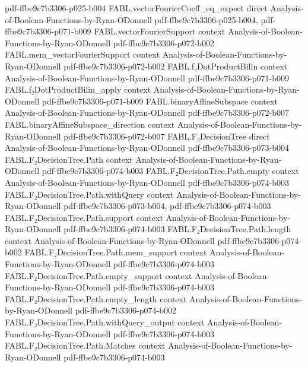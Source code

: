 \begin{theorem}
{    pdf-ffbe9c7b3306-p025-b004}
\proofstep
  {FABL.vectorFourierCoeff_eq_expect}
  {direct}
  {Analysis-of-Boolean-Functions-by-Ryan-ODonnell}
  {pdf-ffbe9c7b3306-p025-b004,
    pdf-ffbe9c7b3306-p071-b009}
\proofstep
  {FABL.vectorFourierSupport}
  {context}
  {Analysis-of-Boolean-Functions-by-Ryan-ODonnell}
  {pdf-ffbe9c7b3306-p072-b002}
\proofstep
  {FABL.mem_vectorFourierSupport}
  {context}
  {Analysis-of-Boolean-Functions-by-Ryan-ODonnell}
  {pdf-ffbe9c7b3306-p072-b002}
\proofstep
  {FABL.f₂DotProductBilin}
  {context}
  {Analysis-of-Boolean-Functions-by-Ryan-ODonnell}
  {pdf-ffbe9c7b3306-p071-b009}
\proofstep
  {FABL.f₂DotProductBilin_apply}
  {context}
  {Analysis-of-Boolean-Functions-by-Ryan-ODonnell}
  {pdf-ffbe9c7b3306-p071-b009}
\proofstep
  {FABL.binaryAffineSubspace}
  {context}
  {Analysis-of-Boolean-Functions-by-Ryan-ODonnell}
  {pdf-ffbe9c7b3306-p072-b007}
\proofstep
  {FABL.binaryAffineSubspace_direction}
  {context}
  {Analysis-of-Boolean-Functions-by-Ryan-ODonnell}
  {pdf-ffbe9c7b3306-p072-b007}
\proofstep
  {FABL.F₂DecisionTree}
  {direct}
  {Analysis-of-Boolean-Functions-by-Ryan-ODonnell}
  {pdf-ffbe9c7b3306-p073-b004}
\proofstep
  {FABL.F₂DecisionTree.Path}
  {context}
  {Analysis-of-Boolean-Functions-by-Ryan-ODonnell}
  {pdf-ffbe9c7b3306-p074-b003}
\proofstep
  {FABL.F₂DecisionTree.Path.empty}
  {context}
  {Analysis-of-Boolean-Functions-by-Ryan-ODonnell}
  {pdf-ffbe9c7b3306-p074-b003}
\proofstep
  {FABL.F₂DecisionTree.Path.withQuery}
  {context}
  {Analysis-of-Boolean-Functions-by-Ryan-ODonnell}
  {pdf-ffbe9c7b3306-p073-b004,
    pdf-ffbe9c7b3306-p074-b003}
\proofstep
  {FABL.F₂DecisionTree.Path.support}
  {context}
  {Analysis-of-Boolean-Functions-by-Ryan-ODonnell}
  {pdf-ffbe9c7b3306-p074-b003}
\proofstep
  {FABL.F₂DecisionTree.Path.length}
  {context}
  {Analysis-of-Boolean-Functions-by-Ryan-ODonnell}
  {pdf-ffbe9c7b3306-p074-b002}
\proofstep
  {FABL.F₂DecisionTree.Path.mem_support}
  {context}
  {Analysis-of-Boolean-Functions-by-Ryan-ODonnell}
  {pdf-ffbe9c7b3306-p074-b003}
\proofstep
  {FABL.F₂DecisionTree.Path.empty_support}
  {context}
  {Analysis-of-Boolean-Functions-by-Ryan-ODonnell}
  {pdf-ffbe9c7b3306-p074-b003}
\proofstep
  {FABL.F₂DecisionTree.Path.empty_length}
  {context}
  {Analysis-of-Boolean-Functions-by-Ryan-ODonnell}
  {pdf-ffbe9c7b3306-p074-b002}
\proofstep
  {FABL.F₂DecisionTree.Path.withQuery_output}
  {context}
  {Analysis-of-Boolean-Functions-by-Ryan-ODonnell}
  {pdf-ffbe9c7b3306-p074-b003}
\proofstep
  {FABL.F₂DecisionTree.Path.Matches}
  {context}
  {Analysis-of-Boolean-Functions-by-Ryan-ODonnell}
  {pdf-ffbe9c7b3306-p074-b003}

\end{theorem}
